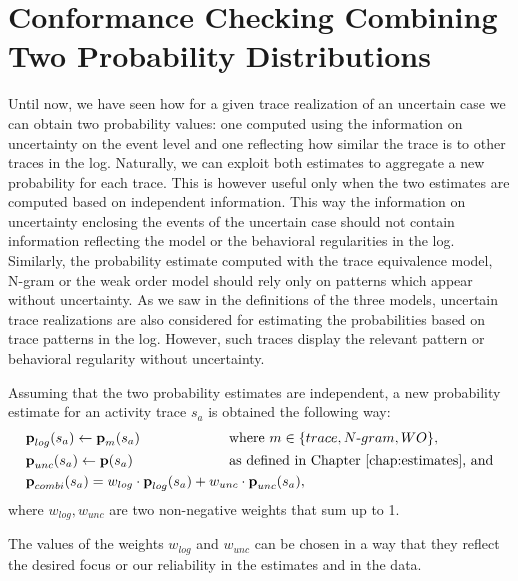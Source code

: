 \section{Conformance Checking Combining Two Probability Distributions}
Until now, we have seen how for a given trace realization of an uncertain case we can obtain two probability values: one computed using the information on uncertainty on the event level and one reflecting how similar the trace is to other traces in the log.
Naturally, we can exploit both estimates to aggregate a new probability for each trace.
This is however useful only when the two estimates are computed based on independent information.
This way the information on uncertainty enclosing the events of the uncertain case should not contain information reflecting the model or the behavioral regularities in the log.
Similarly, the probability estimate computed with the trace equivalence model, N-gram or the weak order model should rely only on patterns which appear without uncertainty.
As we saw in the definitions of the three models, uncertain trace realizations are also considered for estimating the probabilities based on trace patterns in the log.
However, such traces display the relevant pattern or behavioral regularity without uncertainty.
 
Assuming that the two probability estimates are independent, a new probability estimate for an activity trace $s_a$ is obtained the following way:
\begin{align*}
&\textbf{p}_{log}(s_a) \gets \textbf{p}_m(s_a) \text{ \hspace*{2cm} where } m \in \{trace,N \text{-}gram,WO\}, \\
&\textbf{p}_{unc}(s_a) \gets \textbf{p}(s_a) \text{\hspace*{2,3cm} as defined in Chapter \ref{chap:estimates}, and} \\ 
&\textbf{p}_{combi}(s_a) = w_{log} \cdot \textbf{p}_{log}(s_a) + w_{unc} \cdot \textbf{p}_{unc}(s_a),
\end{align*}
where $w_{log}, w_{unc}$ are two non-negative weights that sum up to 1.

The values of the weights $w_{log}$ and $w_{unc}$ can be chosen in a way that they reflect the desired focus or our reliability in the estimates and in the data.


